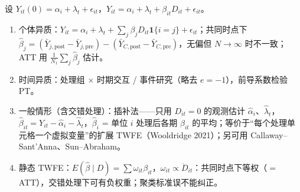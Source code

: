 \begin{thm}[第 2(b) 题答案]\label{thm:U17b-2b}
设 $Y_{it}(0)=\alpha_i+\lambda_t+\epsilon_{it}$，$Y_{it}=\alpha_i+\lambda_t+\beta_{it}D_{it}+\epsilon_{it}$。
\begin{enumerate}
  \item 个体异质：$Y_{it}=\alpha_i+\lambda_t+\sum_j\beta_jD_{it}\mathbf{1}\{i=j\}+\epsilon_{it}$；共同时点下 $\hat\beta_j=(\bar Y_{j,\mathrm{post}}-\bar Y_{j,\mathrm{pre}})-(\bar Y_{C,\mathrm{post}}-\bar Y_{C,\mathrm{pre}})$，无偏但 $N\to\infty$ 时不一致；ATT 用 $\frac1{N_1}\sum_j\hat\beta_j$ 估计。
  \item 时间异质：处理组 $\times$ 时期交互 / 事件研究（略去 $e=-1$），前导系数检验 PT。
  \item 一般情形（含交错处理）：插补法——只用 $D_{it}=0$ 的观测估计 $\hat\alpha_i$、$\hat\lambda_t$，$\hat\beta_{it}=Y_{it}-\hat\alpha_i-\hat\lambda_t$，$\hat\beta_i$ = 单位 $i$ 处理后各期 $\hat\beta_{it}$ 的平均；等价于“每个处理单元格一个虚拟变量”的扩展 TWFE（Wooldridge 2021）；另可用 Callaway--Sant'Anna、Sun--Abraham。
  \item 静态 TWFE：$E(\hat\beta\mid D)=\sum\omega_{it}\beta_{it}$，$\omega_{it}\propto\ddot D_{it}$：共同时点下等权（$=$ATT），交错处理下可有负权重；聚类标准误不能纠正。
\end{enumerate}
\end{thm}

